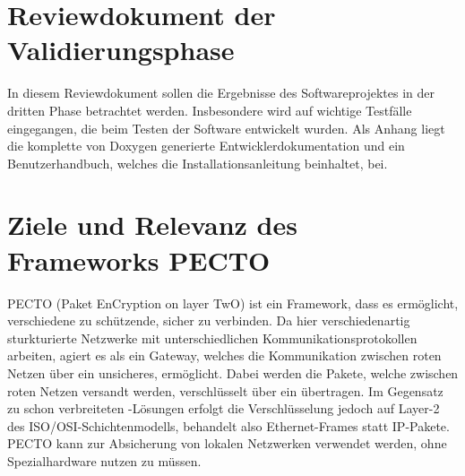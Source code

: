\section*{Reviewdokument der Validierungsphase}
In diesem Reviewdokument sollen die Ergebnisse des Softwareprojektes in der dritten Phase betrachtet werden.
Insbesondere wird auf wichtige Testfälle eingegangen, die beim Testen der Software entwickelt wurden.
Als Anhang liegt die komplette von Doxygen generierte Entwicklerdokumentation und ein Benutzerhandbuch, welches die Installationsanleitung beinhaltet, bei.


\section{Ziele und Relevanz des Frameworks PECTO}
PECTO (Paket EnCryption on layer TwO) ist ein Framework, dass es ermöglicht, verschiedene zu schützende,  sicher zu verbinden.  
Da hier verschiedenartig sturkturierte Netzwerke mit unterschiedlichen Kommunikationsprotokollen arbeiten, agiert es als ein Gateway, welches die Kommunikation zwischen roten Netzen über ein unsicheres,  ermöglicht. 
Dabei werden die Pakete, welche zwischen roten Netzen versandt werden, verschlüsselt über ein  übertragen.
Im Gegensatz zu schon verbreiteten -Lösungen erfolgt die Verschlüsselung jedoch auf Layer-2 des ISO/OSI-Schichtenmodells, behandelt also Ethernet-Frames statt IP-Pakete.
PECTO kann zur Absicherung von lokalen Netzwerken verwendet werden, ohne Spezialhardware nutzen zu müssen.